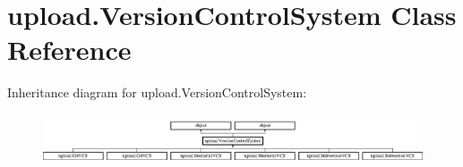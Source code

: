 \hypertarget{classupload_1_1_version_control_system}{}\section{upload.\+Version\+Control\+System Class Reference}
\label{classupload_1_1_version_control_system}
Inheritance diagram for upload.\+Version\+Control\+System\+:\begin{figure}[H]
\begin{center}
\leavevmode
\includegraphics[height=1.497326cm]{df/d72/classupload_1_1_version_control_system}
\end{center}
\end{figure}
